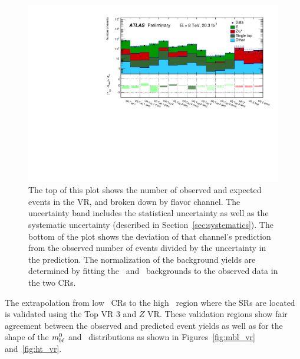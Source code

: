 \begin{figure}[ht]
\centering
\includegraphics[width=\textwidth]{figs/blstop/histpull_VR_detailed.pdf}
\caption{The top of this plot shows the number of observed and expected
  events in the VR, and broken down by flavor channel.
  The uncertainty band includes the statistical uncertainty as well as the
  systematic uncertainty (described in Section~\ref{sec:systematics}). The
  bottom of the plot shows the deviation of that channel's prediction
  from the observed number of events divided by the uncertainty in the
  prediction. The normalization of the background yields are determined
  by fitting the \TTBAR\ and \ZGAMMAJETS\ backgrounds to the observed
  data in the two CRs.
}
\label{fig:pull_dist_vr}
\end{figure}

The extrapolation from low \HT\ CRs to the high \HT\ region
where the SRs are located is validated using the Top VR 3
and $Z$ VR. These validation regions show fair
agreement between the observed and predicted event yields as well as
for the shape of the $m_{b\ell}^{0}$ and \HT\ distributions as shown in
Figures~\ref{fig:mbl_vr} and~\ref{fig:ht_vr}.

